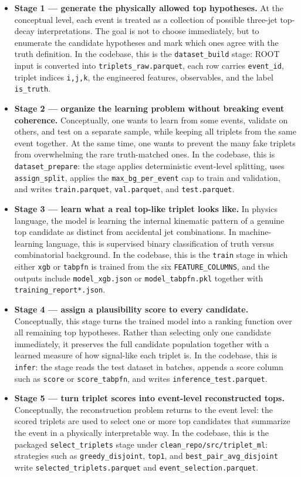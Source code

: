 \documentclass[11pt]{article}
\begin{document}
\begin{itemize}[leftmargin=*]
  \item \textbf{Stage 1 --- generate the physically allowed top hypotheses.} At the conceptual level, each event is treated as a collection of possible three-jet top-decay interpretations. The goal is not to choose immediately, but to enumerate the candidate hypotheses and mark which ones agree with the truth definition. In the codebase, this is the \texttt{dataset\_build} stage: ROOT input is converted into \texttt{triplets\_raw.parquet}, each row carries \texttt{event\_id}, triplet indices \texttt{i,j,k}, the engineered features, observables, and the label \texttt{is\_truth}.
  \item \textbf{Stage 2 --- organize the learning problem without breaking event coherence.} Conceptually, one wants to learn from some events, validate on others, and test on a separate sample, while keeping all triplets from the same event together. At the same time, one wants to prevent the many fake triplets from overwhelming the rare truth-matched ones. In the codebase, this is \texttt{dataset\_prepare}: the stage applies deterministic event-level splitting, uses \texttt{assign\_split}, applies the \texttt{max\_bg\_per\_event} cap to train and validation, and writes \texttt{train.parquet}, \texttt{val.parquet}, and \texttt{test.parquet}.
  \item \textbf{Stage 3 --- learn what a real top-like triplet looks like.} In physics language, the model is learning the internal kinematic pattern of a genuine top candidate as distinct from accidental jet combinations. In machine-learning language, this is supervised binary classification of truth versus combinatorial background. In the codebase, this is the \texttt{train} stage in which either \texttt{xgb} or \texttt{tabpfn} is trained from the six \texttt{FEATURE\_COLUMNS}, and the outputs include \texttt{model\_xgb.json} or \texttt{model\_tabpfn.pkl} together with \texttt{training\_report*.json}.
  \item \textbf{Stage 4 --- assign a plausibility score to every candidate.} Conceptually, this stage turns the trained model into a ranking function over all remaining top hypotheses. Rather than selecting only one candidate immediately, it preserves the full candidate population together with a learned measure of how signal-like each triplet is. In the codebase, this is \texttt{infer}: the stage reads the test dataset in batches, appends a score column such as \texttt{score} or \texttt{score\_tabpfn}, and writes \texttt{inference\_test.parquet}.
  \item \textbf{Stage 5 --- turn triplet scores into event-level reconstructed tops.} Conceptually, the reconstruction problem returns to the event level: the scored triplets are used to select one or more top candidates that summarize the event in a physically interpretable way. In the codebase, this is the packaged \texttt{select\_triplets} stage under \texttt{clean\_repo/src/triplet\_ml}: strategies such as \texttt{greedy\_disjoint}, \texttt{top1}, and \texttt{best\_pair\_avg\_disjoint} write \texttt{selected\_triplets.parquet} and \texttt{event\_selection.parquet}.
\end{itemize}
\end{document}
